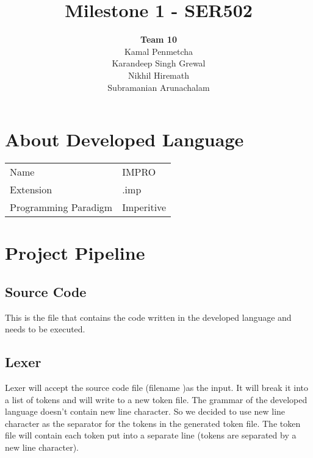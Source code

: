 \documentclass[12pt,letterpaper]{article}
\title{Milestone 1 - SER502}
\author{\textbf{Team 10}\\ Kamal Penmetcha\\Karandeep Singh Grewal\\Nikhil Hiremath\\Subramanian Arunachalam}
\begin{document}
\maketitle

\section{About Developed Language}
\begin{tabular}{ll}
    Name      & IMPRO \\
    Extension & .imp  \\
    Programming Paradigm & Imperitive
\end{tabular}

\section{Project Pipeline}

\subsection{Source Code}
This is the file that contains the code written in the developed language and needs to be executed.
\subsection{Lexer}
Lexer will accept the source code file (filename )as the input. It will break it into a list of tokens and will write to a new token file. The grammar of the developed language doesn't contain new line character. So we decided to use new line character as the separator for the tokens in the generated token file. The token file will contain each token put into a separate line (tokens are separated by a new line character).
\end{document}
